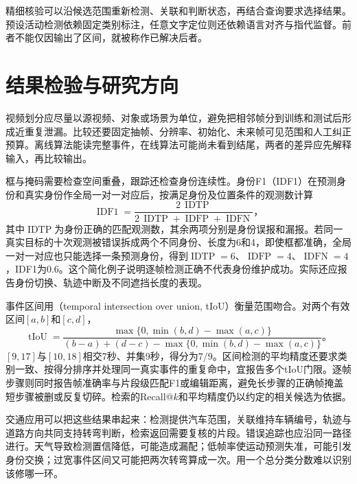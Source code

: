 精细核验可以沿候选范围重新检测、关联和判断状态，再结合查询要求选择结果。预设活动检测依赖固定类别标注，任意文字定位则还依赖语言对齐与指代监督。前者不能仅因输出了区间，就被称作已解决后者。

\section{结果检验与研究方向}
\label{sec:vision-video-evaluation}

视频划分应尽量以源视频、对象或场景为单位，避免把相邻帧分到训练和测试后形成近重复泄漏。比较还要固定抽帧、分辨率、初始化、未来帧可见范围和人工纠正预算。离线算法能读完整事件，在线算法可能尚未看到结尾，两者的差异应先解释输入，再比较输出。

框与掩码需要检查空间重叠，跟踪还检查身份连续性。身份F1（IDF1）在预测身份和真实身份作全局一对一对应后，按满足身份及位置条件的观测数计算
\begin{equation}
  \operatorname{IDF1}
  =\frac{2\,\operatorname{IDTP}}
  {2\,\operatorname{IDTP}+\operatorname{IDFP}+\operatorname{IDFN}}\text{，}
  \label{eq:vision-video-idf1}
\end{equation}
其中$\operatorname{IDTP}$为身份正确的匹配观测数，其余两项分别是身份误报和漏报。若同一真实目标的十次观测被错误拆成两个不同身份、长度为6和4，即使框都准确，全局一对一对应也只能选择一条预测身份，得到$\operatorname{IDTP}=6$、$\operatorname{IDFP}=4$、$\operatorname{IDFN}=4$，IDF1为0.6。这个简化例子说明逐帧检测正确不代表身份维护成功。实际还应报告身份切换、轨迹中断及不同遮挡长度的表现。

事件区间用（temporal intersection over union, tIoU）衡量范围吻合。对两个有效区间$[a,b]$和$[c,d]$，
\begin{equation}
  \operatorname{tIoU}
  =\frac{\max\{0,\min(b,d)-\max(a,c)\}}
  {(b-a)+(d-c)-\max\{0,\min(b,d)-\max(a,c)\}}\text{。}
  \label{eq:vision-video-tiou}
\end{equation}
$[9,17]$与$[10,18]$相交7秒、并集9秒，得分为$7/9$。区间检测的平均精度还要求类别一致、按得分排序并处理同一真实事件的重复命中，宜报告多个tIoU门限。逐帧步骤则同时报告帧准确率与片段级匹配F1或编辑距离，避免长步骤的正确帧掩盖短步骤被删或反复切碎。检索的Recall@$k$和平均精度仍以约定的相关候选为依据。

交通应用可以把这些结果串起来：检测提供汽车范围，关联维持车辆编号，轨迹与道路方向共同支持转弯判断，检索返回需要复核的片段。错误追踪也应沿同一路径进行。天气导致检测置信降低，可能造成漏配；低帧率使运动预测失准，可能引发身份交换；过宽事件区间又可能把两次转弯算成一次。用一个总分类分数难以识别该修哪一环。

